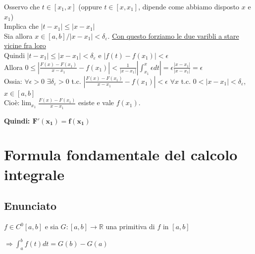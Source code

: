 \documentclass{article}
\newcommand{\R}{\mathbb{R}}
\newcommand{\DeltaEp}{\delta_{\varepsilon}} %
\begin{document}
\begin{flushleft}
Osservo che $t\in[x_1, x]$ (oppure $t\in[x, x_1]$, dipende come abbiamo disposto $x$ e $x_1$)
\\Implica che $\left|t-x_1\right| \leq \left|x - x_1\right|$
\\Sia allora $x\in[a, b] / \left|x-x_1\right|<\DeltaEp$. \underline{Con questo forziamo le due varibli a stare vicine fra loro}
\\Quindi $\left|t-x_1\right| \leq \left|x-x_1\right|<\DeltaEp$ e $\left|f(t) - f(x_1)\right|<\epsilon$
\\Allora $0\leq\left|\frac{F(x)-F(x_1)}{x-x_1}-f(x_1)\right| < \frac{1}{\left|x-x_1\right|}\left|\int_{x_1}^{x}\epsilon dt\right| = \epsilon \frac{\left|x-x_1\right|}{\left|x-x_1\right|} = \epsilon$
\\Ossia: $\forall \epsilon > 0$ $\exists \DeltaEp > 0$ t.c. $\left|\frac{F(x)-F(x_1)}{x-x_1}-f(x_1)\right|<\epsilon$ $\forall x$ t.c. $0<\left|x-x_1\right|<\DeltaEp$, $x\in[a,b]$
\\Cioè:$\lim_{x_1}\frac{F(x)-F(x_1)}{x-x_1}$ esiste e vale $f(x_1)$.
\\\begin{center} \textbf{Quindi: $\mathbf{F'(x_1) = f(x_1)}$}\end{center}

\newpage
\section{Formula fondamentale del calcolo integrale}
\subsection{Enunciato}
$f \in C^0[a,b]$ e sia $G : [a,b] \rightarrow {\R}$ una primitiva di $f$ in $[a,b]$
\\\begin{center}$\Rightarrow \int_{a}^{b}f(t)dt = G(b) - G(a)$\end{center}


\end{flushleft}
\end{document}
